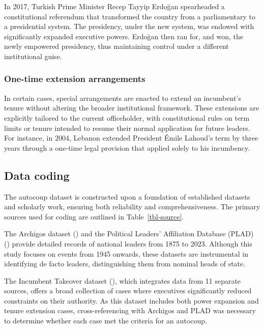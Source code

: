 \documentclass[
  12pt,
]{report}
\begin{document}
In 2017, Turkish Prime Minister Recep Tayyip Erdoğan spearheaded a
constitutional referendum that transformed the country from a
parliamentary to a presidential system. The presidency, under the new
system, was endowed with significantly expanded executive powers.
Erdoğan then ran for, and won, the newly empowered presidency, thus
maintaining control under a different institutional guise.

\subsubsection*{One-time extension
arrangements}\label{one-time-extension-arrangements}

In certain cases, special arrangements are enacted to extend an
incumbent's tenure without altering the broader institutional framework.
These extensions are explicitly tailored to the current officeholder,
with constitutional rules on term limits or tenure intended to resume
their normal application for future leaders. For instance, in 2004,
Lebanon extended President Émile Lahoud's term by three years through a
one-time legal provision that applied solely to his incumbency.

\subsection*{Data coding}\label{data-coding}

The autocoup dataset is constructed upon a foundation of established
datasets and scholarly work, ensuring both reliability and
comprehensiveness. The primary sources used for coding are outlined in
Table~\ref{tbl-source}.

The Archigos dataset () and the Political Leaders' Affiliation Database (PLAD)
() provide
detailed records of national leaders from 1875 to 2023. Although this
study focuses on events from 1945 onwards, these datasets are
instrumental in identifying de facto leaders, distinguishing them from
nominal heads of state.

The Incumbent Takeover dataset (), which integrates data from 11 separate sources, offers
a broad collection of cases where executives significantly reduced
constraints on their authority. As this dataset includes both power
expansion and tenure extension cases, cross-referencing with Archigos
and PLAD was necessary to determine whether each case met the criteria
for an autocoup.
\end{document}
